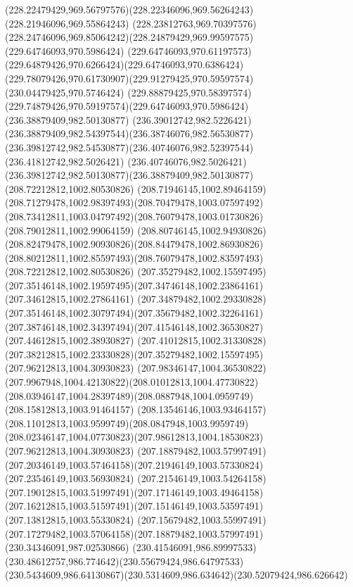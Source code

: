 {{\curveto(228.22479429,969.56797576)(228.22346096,969.56264243)(228.21946096,969.55864243)
\curveto(228.23812763,969.70397576)(228.24746096,969.85064242)(228.24879429,969.99597575)
\moveto(229.64746093,970.5986424)
\curveto(229.64746093,970.61197573)(229.64879426,970.6266424)(229.64746093,970.6386424)
\curveto(229.78079426,970.61730907)(229.91279425,970.59597574)(230.04479425,970.5746424)
\curveto(229.88879425,970.58397574)(229.74879426,970.59197574)(229.64746093,970.5986424)
\moveto(236.38879409,982.50130877)
\curveto(236.39012742,982.5226421)(236.38879409,982.54397544)(236.38746076,982.56530877)
\curveto(236.39812742,982.54530877)(236.40746076,982.52397544)(236.41812742,982.5026421)
\curveto(236.40746076,982.5026421)(236.39812742,982.50130877)(236.38879409,982.50130877)
\moveto(208.72212812,1002.80530826)
\curveto(208.71946145,1002.89464159)(208.71279478,1002.98397493)(208.70479478,1003.07597492)
\curveto(208.73412811,1003.04797492)(208.76079478,1003.01730826)(208.79012811,1002.99064159)
\curveto(208.80746145,1002.94930826)(208.82479478,1002.90930826)(208.84479478,1002.86930826)
\curveto(208.80212811,1002.85597493)(208.76079478,1002.83597493)(208.72212812,1002.80530826)
\moveto(207.35279482,1002.15597495)
\curveto(207.35146148,1002.19597495)(207.34746148,1002.23864161)(207.34612815,1002.27864161)
\curveto(207.34879482,1002.29330828)(207.35146148,1002.30797494)(207.35679482,1002.32264161)
\curveto(207.38746148,1002.34397494)(207.41546148,1002.36530827)(207.44612815,1002.38930827)
\curveto(207.41012815,1002.31330828)(207.38212815,1002.23330828)(207.35279482,1002.15597495)
\moveto(207.96212813,1004.30930823)
\curveto(207.98346147,1004.36530822)(207.9967948,1004.42130822)(208.01012813,1004.47730822)
\curveto(208.03946147,1004.28397489)(208.0887948,1004.0959749)(208.15812813,1003.91464157)
\curveto(208.13546146,1003.93464157)(208.11012813,1003.9599749)(208.0847948,1003.9959749)
\curveto(208.02346147,1004.07730823)(207.98612813,1004.18530823)(207.96212813,1004.30930823)
\moveto(207.18879482,1003.57997491)
\curveto(207.20346149,1003.57464158)(207.21946149,1003.57330824)(207.23546149,1003.56930824)
\curveto(207.21546149,1003.54264158)(207.19012815,1003.51997491)(207.17146149,1003.49464158)
\curveto(207.16212815,1003.51597491)(207.15146149,1003.53597491)(207.13812815,1003.55330824)
\curveto(207.15679482,1003.55997491)(207.17279482,1003.57064158)(207.18879482,1003.57997491)
\moveto(230.34346091,987.02530866)
\curveto(230.41546091,986.89997533)(230.48612757,986.774642)(230.55679424,986.64797533)
\curveto(230.5434609,986.64130867)(230.5314609,986.634642)(230.52079424,986.626642)
}}
